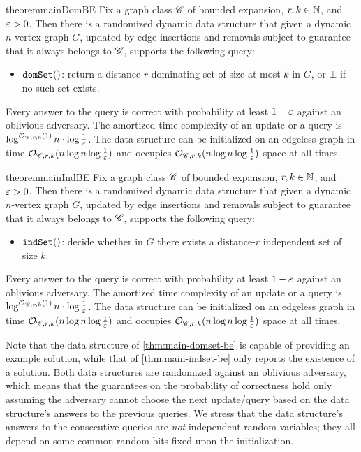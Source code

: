 \begin{restatable}{theorem}{mainDomBE}\label{thm:main-domset-be}
	Fix a graph class $\mathscr C$ of bounded expansion, $r,k\in \mathbb{N}$, and $\varepsilon>0$. Then there is a randomized dynamic data structure that given a dynamic $n$-vertex graph $G$, updated by edge insertions and removals subject to guarantee that it always belongs to $\mathscr C$, supports the following query:
	\begin{itemize}
		\item $\mathtt{domSet}()$: return a distance-$r$ dominating set of size at most $k$ in $G$, or $\bot$ if no such set exists.
	\end{itemize}
	Every answer to the query is correct with probability at least $1-\varepsilon$ against an oblivious adversary.
	The amortized time complexity of an update or a query is $\log^{\mathcal{O}_{\mathscr C,r,k}(1)} n\cdot \log \tfrac{1}{\varepsilon}$. The data structure can be initialized on an edgeless graph in time $\mathcal{O}_{\mathscr C,r,k}(n\log n\log \tfrac{1}{\varepsilon})$ and occupies  $\mathcal{O}_{\mathscr C,r,k}(n\log n\log \tfrac{1}{\varepsilon})$ space at all times.
\end{restatable}

\vspace{-0.3cm}

\begin{restatable}{theorem}{mainIndBE}\label{thm:main-indset-be}
	Fix a graph class $\mathscr C$ of bounded expansion, $r,k\in \mathbb{N}$, and $\varepsilon>0$. Then there is a randomized dynamic data structure that given a dynamic $n$-vertex graph $G$, updated by edge insertions and removals subject to guarantee that it always belongs to $\mathscr C$, supports the following query:
	\begin{itemize}
		\item $\mathtt{indSet}()$: decide whether in $G$ there exists a distance-$r$ independent set of size $k$.
	\end{itemize}
	Every answer to the query is correct with probability at least $1-\varepsilon$ against an oblivious adversary.
	The amortized time complexity of an update or a query is $\log^{\mathcal{O}_{\mathscr C,r,k}(1)} n\cdot \log \tfrac{1}{\varepsilon}$. The data structure can be initialized on an edgeless graph in time $\mathcal{O}_{\mathscr C,r,k}(n\log n\log \tfrac{1}{\varepsilon})$ and occupies  $\mathcal{O}_{\mathscr C,r,k}(n\log n\log \tfrac{1}{\varepsilon})$ space at all times.
\end{restatable}

Note that the data structure of \cref{thm:main-domset-be} is capable of providing an example solution, while that of \cref{thm:main-indset-be} only reports the existence of a solution. Both data structures are randomized against an oblivious adversary, which means that the guarantees on the probability of correctness hold only assuming the adversary cannot choose the next update/query based on the data structure's answers to the previous queries. We stress that the data structure's answers to the consecutive queries are \emph{not} independent random variables; they all depend on some common random bits fixed upon the initialization. 

